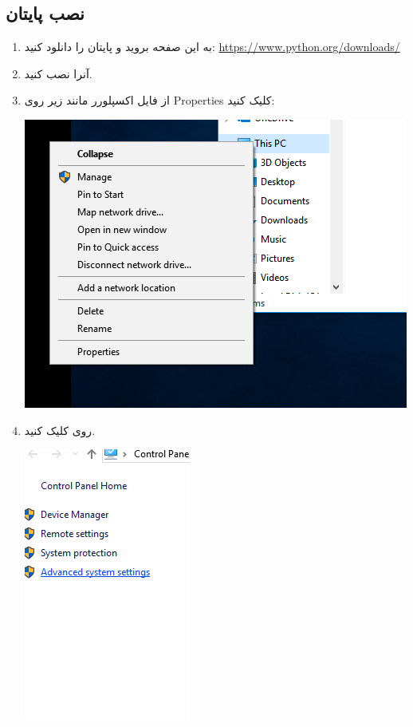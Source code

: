 \documentclass[14pt,a4paper]{memoir}
\begin{document}
	\subsection{نصب پایتان}\label{pyinstall}
\begin{enumerate}
	\item به این صفحه بروید و پایتان را دانلود کنید: \url{https://www.python.org/downloads/}
	\item آنرا نصب کنید.
	\item از فایل اکسپلورر مانند زیر روی Properties کلیک کنید:
		 \begin{center}
		\includegraphics[scale=1]{InstallPython_1}
	\end{center}
	\item  روی  کلیک کنید.
	\begin{center}
		\includegraphics[scale=1]{InstallPython_2}

\end{center}
\end{enumerate}
\end{document}
